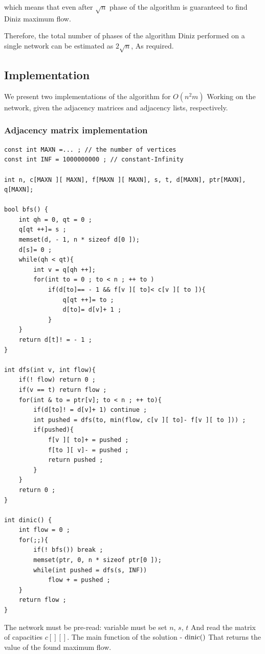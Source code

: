 which means that even after $\sqrt {n}$ phase of the algorithm is guaranteed to find Diniz maximum flow.

Therefore, the total number of phases of the algorithm Diniz performed on a single network can be estimated as $2 \sqrt {n}$, As required.

\subsection{ Implementation }

We present two implementations of the algorithm for $O (n ^ 2 m)$ Working on the network, given the adjacency matrices and adjacency lists, respectively.

\subsubsection{ Adjacency matrix implementation }

\begin{verbatim}
const int MAXN =... ; // the number of vertices
const int INF = 1000000000 ; // constant-Infinity
 
int n, c[MAXN ][ MAXN], f[MAXN ][ MAXN], s, t, d[MAXN], ptr[MAXN], q[MAXN];
 
bool bfs() {
    int qh = 0, qt = 0 ;
    q[qt ++]= s ;
    memset(d, - 1, n * sizeof d[0 ]);
    d[s]= 0 ;
    while(qh < qt){
        int v = q[qh ++];
        for(int to = 0 ; to < n ; ++ to )
            if(d[to]== - 1 && f[v ][ to]< c[v ][ to ]){
                q[qt ++]= to ;
                d[to]= d[v]+ 1 ;
            }
    }
    return d[t]! = - 1 ;
}
 
int dfs(int v, int flow){
    if(! flow) return 0 ;
    if(v == t) return flow ;
    for(int & to = ptr[v]; to < n ; ++ to){
        if(d[to]! = d[v]+ 1) continue ;
        int pushed = dfs(to, min(flow, c[v ][ to]- f[v ][ to ])) ;
        if(pushed){
            f[v ][ to]+ = pushed ;
            f[to ][ v]- = pushed ;
            return pushed ;
        }
    }
    return 0 ;
}
 
int dinic() {
    int flow = 0 ;
    for(;;){
        if(! bfs()) break ;
        memset(ptr, 0, n * sizeof ptr[0 ]);
        while(int pushed = dfs(s, INF))
            flow + = pushed ;
    }
    return flow ;
} 
\end{verbatim}
The network must be pre-read: variable must be set $n$, $s$, $t$ And read the matrix of capacities $c [][]$. The main function of the solution - $\rm dinic()$ That returns the value of the found maximum flow.

